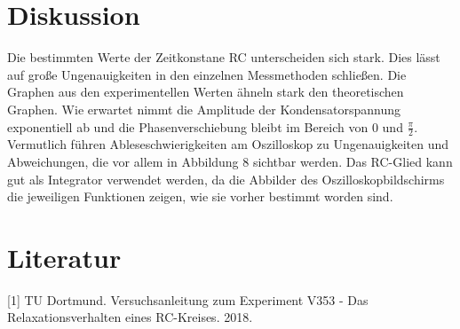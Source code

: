 \section{Diskussion}

Die bestimmten Werte der Zeitkonstane RC unterscheiden sich stark. Dies lässt auf große Ungenauigkeiten in den einzelnen Messmethoden schließen.
Die Graphen aus den experimentellen Werten ähneln stark den theoretischen Graphen.
Wie erwartet nimmt die Amplitude der Kondensatorspannung exponentiell ab und die Phasenverschiebung bleibt im Bereich von 0 und $\frac{\pi}{2}$.
Vermutlich führen Ableseschwierigkeiten am Oszilloskop zu Ungenauigkeiten und Abweichungen, die vor allem in Abbildung 8 sichtbar werden.
Das RC-Glied kann gut als Integrator verwendet werden, da die Abbilder des Oszilloskopbildschirms die jeweiligen Funktionen zeigen, wie sie vorher bestimmt worden sind.

\section{Literatur}

[1] TU Dortmund. Versuchsanleitung zum Experiment V353 - Das Relaxationsverhalten eines RC-Kreises. 2018.